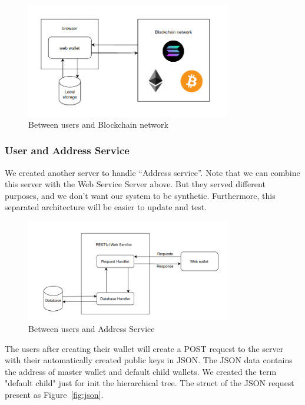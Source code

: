 \begin{figure}[ht!]
    \centering
    \includegraphics[width=0.8\textwidth]{images/design_ubl.png}
    \caption[Between users and Blockchain network]{Between users and Blockchain network}
    \label{fig:ubl}
\end{figure}

\subsubsection{User and Address Service}

We created another server to handle “Address service”. Note that we can combine this server with the Web Service Server above. But they served different purposes, and we don’t want our system to be synthetic. Furthermore, this separated architecture will be easier to update and test.

\begin{figure}[ht!]
    \centering
    \includegraphics[width=0.8\textwidth]{images/design_uas.png}
    \caption[Between users and Address Service]{Between users and Address Service}
    \label{fig:uas}
\end{figure}

The users after creating their wallet will create a POST request to the server with their automatically created public keys in JSON.
The JSON data contains the address of master wallet and default child wallets.
We created the term "default child" just for init the hierarchical tree.
The struct of the JSON request present as Figure~\ref{fig:json}.

